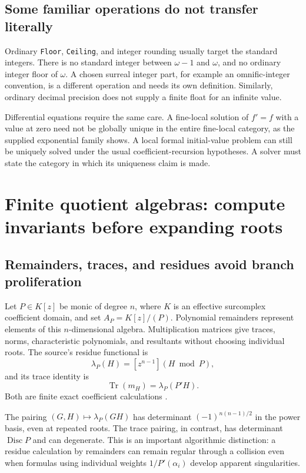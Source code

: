 \documentclass[11pt,letterpaper]{article}
\numberwithin{equation}{section}
\theoremstyle{definition}
\theoremstyle{remark}\newtheorem{remark}[theorem]{Remark}
\newcommand{\Tr}{\operatorname{Tr}}
\newcommand{\Disc}{\operatorname{Disc}}
\begin{document}
\subsection{Some familiar operations do not transfer literally}
Ordinary \texttt{Floor}, \texttt{Ceiling}, and integer rounding usually target
the standard integers. There is no standard integer between $\omega-1$ and
$\omega$, and no ordinary integer floor of $\omega$. A chosen surreal integer
part, for example an omnific-integer convention, is a different operation and
needs its own definition. Similarly, ordinary decimal precision does not
supply a finite float for an infinite value.

Differential equations require the same care. A fine-local solution of
$f'=f$ with a value at zero need not be globally unique in the entire
fine-local category, as the supplied exponential family shows. A local
formal initial-value problem can still be uniquely solved under the usual
coefficient-recursion hypotheses. A solver must state the category in which
its uniqueness claim is made.

\section{Finite quotient algebras: compute invariants before expanding roots}
\label{sec:quotients}

\subsection{Remainders, traces, and residues avoid branch proliferation}
Let $P\in K[z]$ be monic of degree $n$, where $K$ is an effective surcomplex
coefficient domain, and set $A_P=K[z]/(P)$. Polynomial remainders represent
elements of this $n$-dimensional algebra. Multiplication matrices give traces,
norms, characteristic polynomials, and resultants without choosing individual
roots. The source's residue functional is
\begin{equation}\label{eq:residuefunctional}
 \lambda_P(H)=[z^{n-1}](H\bmod P),
\end{equation}
and its trace identity is
\[
 \Tr(m_H)=\lambda_P(P'H).
\]
Both are finite exact coefficient calculations \cite{SourcePolynomial}.

The pairing $(G,H)\mapsto\lambda_P(GH)$ has determinant
$(-1)^{n(n-1)/2}$ in the power basis, even at repeated roots. The trace pairing,
in contrast, has determinant $\Disc P$ and can degenerate. This is an
important algorithmic distinction: a residue calculation by remainders can
remain regular through a collision even when formulas using individual
weights $1/P'(\alpha_i)$ develop apparent singularities.
\end{document}
